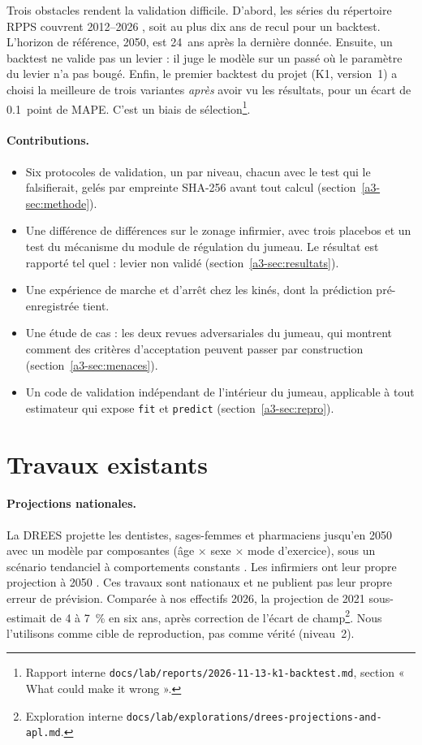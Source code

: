 Trois obstacles rendent la validation difficile. D'abord, les séries du répertoire RPPS couvrent
2012--2026 \citep{a3-drees2026demo}, soit au plus dix ans de recul pour un backtest. L'horizon de
référence, 2050, est 24\derive{}~ans après la dernière donnée. Ensuite, un backtest ne valide pas un
levier : il juge le modèle sur un passé où le paramètre du levier n'a pas bougé. Enfin, le premier
backtest du projet (K1, version~1) a choisi la meilleure de trois variantes \emph{après} avoir vu les
résultats, pour un écart de \num{0.1}\mesure{}~point de MAPE. C'est un biais de
sélection\footnote{Rapport interne \texttt{docs/lab/reports/2026-11-13-k1-backtest.md}, section
« What could make it wrong ».}.

\paragraph{Contributions.}
\begin{itemize}
  \item Six protocoles de validation, un par niveau, chacun avec le test qui le falsifierait, gelés
        par empreinte SHA-256 avant tout calcul (section~\ref{a3-sec:methode}).
  \item Une différence de différences sur le zonage infirmier, avec trois placebos et un test du
        mécanisme du module de régulation du jumeau. Le résultat est rapporté tel quel : levier
        non validé (section~\ref{a3-sec:resultats}).
  \item Une expérience de marche et d'arrêt chez les kinés, dont la prédiction pré-enregistrée tient.
  \item Une étude de cas : les deux revues adversariales du jumeau, qui montrent comment des critères
        d'acceptation peuvent passer par construction (section~\ref{a3-sec:menaces}).
  \item Un code de validation indépendant de l'intérieur du jumeau, applicable à tout estimateur
        qui expose \texttt{fit} et \texttt{predict} (section~\ref{a3-sec:repro}).
\end{itemize}

\section{Travaux existants}
\paragraph{Projections nationales.} La DREES projette les dentistes, sages-femmes et pharmaciens
jusqu'en 2050 avec un modèle par composantes (âge $\times$ sexe $\times$ mode d'exercice), sous un
scénario tendanciel à comportements constants \citep{a3-drees2021dd76}. Les infirmiers ont leur propre
projection à 2050 \citep{a3-er1319}. Ces travaux sont nationaux et ne publient pas leur propre erreur
de prévision. Comparée à nos effectifs 2026, la projection de 2021 sous-estimait de 4 à
7\derive{}~\% en six ans, après correction de l'écart de champ\footnote{Exploration interne
\texttt{docs/lab/explorations/drees-projections-and-apl.md}.}. Nous l'utilisons comme cible de
reproduction, pas comme vérité (niveau~2).

